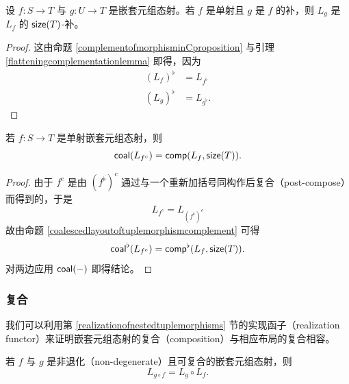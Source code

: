 \begin{proposition}
    设 $f:S \to T$ 与 $g:U \to T$ 是嵌套元组态射。若 $f$ 是单射且 $g$ 是 $f$ 的补，则 $L_{g}$ 是 $L_f$ 的 $\mathsf{size}(T)$-补。
\end{proposition}
\begin{proof}
    这由命题 \ref{complementofmorphisminCproposition} 与引理 \ref{flatteningcomplementationlemma} 即得，因为
    \begin{align*}
    (L_f)^\flat & = L_{f^\flat}\\
    (L_{g})^\flat & = L_{g^\flat}.
    \end{align*}
\end{proof}


\begin{proposition}\label{coalescedlayoutoftuplemorphismcomplement}
    若 $f:S \to T$ 是单射嵌套元组态射，则
    \[
    \mathsf{coal}(L_{f^c}) = \mathsf{comp}(L_f,\mathsf{size}(T)).
    \]
\end{proposition}
\begin{proof} 由于 $f^c$ 是由 $(f^\flat)^c$ 通过与一个重新加括号同构作后复合（post-compose）而得到的，于是
\[
L_{f^c} = L_{(f^\flat)^c}
\]
故由命题 \ref{coalescedlayoutoftuplemorphismcomplement} 可得
\[
\mathsf{coal}^\flat(L_{f^c})  = \mathsf{comp}^\flat(L_f,\mathsf{size}(T)).
\]
对两边应用 $\mathsf{coal}(-)$ 即得结论。
\end{proof}


\subsubsection{复合}

我们可以利用第 \ref{realizationofnestedtuplemorphisms} 节的实现函子（realization functor）来证明嵌套元组态射的复合（composition）与相应布局的复合相容。
\begin{theorem}\label{compatibilityofcompositioninD}
    若 $f$ 与 $g$ 是非退化（non-degenerate）且可复合的嵌套元组态射，则
    \[
    L_{g\circ f} = L_{g} \circ L_{f}.
    \]
\end{theorem}

